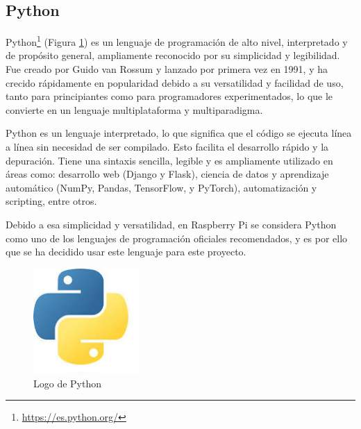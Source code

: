 
\subsection{Python}
\label{subsec:python}

Python\footnote{\url{https://es.python.org/}} (Figura \ref{fig:python}) es un lenguaje de programación de alto nivel, interpretado y de propósito general, ampliamente reconocido por su simplicidad y legibilidad. Fue creado por Guido van Rossum y lanzado por primera vez en 1991, y ha crecido rápidamente en popularidad debido a su versatilidad y facilidad de uso, tanto para principiantes como para programadores experimentados, lo que le convierte en un lenguaje multiplataforma y multiparadigma.

Python es un lenguaje interpretado, lo que significa que el código se ejecuta línea a línea sin necesidad de ser compilado. Esto facilita el desarrollo rápido y la depuración. Tiene una sintaxis sencilla, legible y es ampliamente utilizado en áreas como: desarrollo web (Django y Flask), ciencia de datos y aprendizaje automático (NumPy, Pandas, TensorFlow, y PyTorch), automatización y scripting, entre otros.

Debido a esa simplicidad y versatilidad, en Raspberry Pi se considera Python como uno de los lenguajes de programación oficiales recomendados, y es por ello que se ha decidido usar este lenguaje para este proyecto.

\begin{figure} [h!]
	\begin{center}
		\includegraphics[width=4cm]{figs/python.png}
	\end{center}
	\caption{Logo de Python}  %
	\label{fig:python}
\end{figure}


